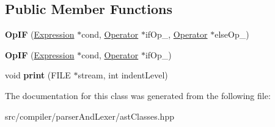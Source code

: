 \subsection*{Public Member Functions}
\begin{DoxyCompactItemize}
\item 
{\bfseries Op\+IF} (\hyperlink{classslang__AST__NODES_1_1Expression}{Expression} $\ast$cond, \hyperlink{classslang__AST__NODES_1_1Operator}{Operator} $\ast$if\+Op\+\_\+, \hyperlink{classslang__AST__NODES_1_1Operator}{Operator} $\ast$else\+Op\+\_\+)\hypertarget{classslang__AST__NODES_1_1OpIF_a77a112bc398c4594cbdbf7e5c8a9929e}{}\label{classslang__AST__NODES_1_1OpIF_a77a112bc398c4594cbdbf7e5c8a9929e}

\item 
{\bfseries Op\+IF} (\hyperlink{classslang__AST__NODES_1_1Expression}{Expression} $\ast$cond, \hyperlink{classslang__AST__NODES_1_1Operator}{Operator} $\ast$if\+Op\+\_\+)\hypertarget{classslang__AST__NODES_1_1OpIF_ac45b7c8e8412ecabc7d4cba9c45fa71f}{}\label{classslang__AST__NODES_1_1OpIF_ac45b7c8e8412ecabc7d4cba9c45fa71f}

\item 
void {\bfseries print} (F\+I\+LE $\ast$stream, int indent\+Level)\hypertarget{classslang__AST__NODES_1_1OpIF_a6cc095933d18ded2278145c760629bb5}{}\label{classslang__AST__NODES_1_1OpIF_a6cc095933d18ded2278145c760629bb5}

\end{DoxyCompactItemize}


The documentation for this class was generated from the following file\+:\begin{DoxyCompactItemize}
\item 
src/compiler/parser\+And\+Lexer/ast\+Classes.\+hpp\end{DoxyCompactItemize}
